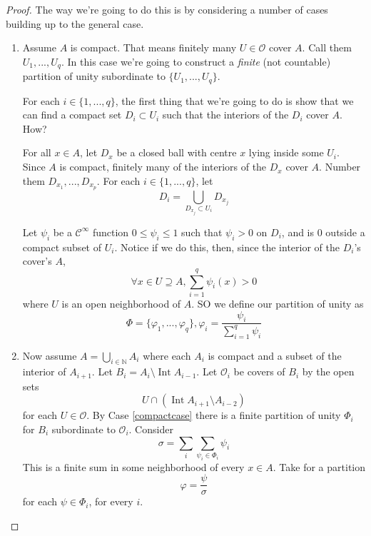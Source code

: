 \documentclass{article}
\DeclareMathOperator{\Int}{Int}
\newcommand{\nats}[0]{\mathbb{N}}
\newcommand{\mc}[1]{\mathcal{#1}}
\begin{document}
\begin{proof}

  The way we're going to do this is by considering a number of cases building up to the general case.

  \begin{enumerate}

    \item Assume \(A\) is compact. That means finitely many \(U \in \mc{O}\) cover \(A\). Call them \(U_1,...,U_q\). In this case we're going to construct a \textit{finite} (not countable) partition of unity subordinate to \(\{U_1,...,U_q\}\).

    For each \(i \in \{1,...,q\}\), the first thing that we're going to do is show that we can find a compact set \(D_i \subset U_i\) such that the interiors of the \(D_i\) cover \(A\). How?

    For all \(x \in A\), let \(D_x\) be a closed ball with centre \(x\) lying inside some \(U_i\). Since \(A\) is compact, finitely many of the interiors of the \(D_x\) cover \(A\). Number them \(D_{x_1},...,D_{x_p}\). For each \(i \in \{1,...,q\}\), let
    \begin{equation}
      D_i = \bigcup_{D_{x_j} \subset U_i}D_{x_j}
    \end{equation}

    Let \(\psi_i\) be a \(\mc{C}^\infty\) function \(0 \leq \psi_i \leq 1\) such that \(\psi_i > 0\) on \(D_i\), and is 0 outside a compact subset of \(U_i\). Notice if we do this, then, since the interior of the \(D_i\)'s cover's \(A\),
    \begin{equation}
      \forall x \in U \supseteq A, \sum_{i = 1}^q\psi_i(x) > 0
    \end{equation}
    where \(U\) is an open neighborhood of \(A\). SO we define our partition of unity as
    \begin{equation}
      \Phi = \{\varphi_1,...,\varphi_q\}, \varphi_i = \frac{\psi_i}{\sum_{i = 1}^q\psi_i}
    \end{equation}
    \label{compactcase}

    \item Now assume \(A = \bigcup_{i \in \nats}A_i\) where each \(A_i\) is compact and a subset of the interior of \(A_{i + 1}\). Let \(B_i = A_i \setminus \Int A_{i - 1}\). Let \(\mc{O}_i\) be covers of \(B_i\) by the open sets
    \begin{equation}
      U \cap (\Int A_{i + 1} \setminus A_{i - 2})
    \end{equation}
    for each \(U \in \mc{O}\). By Case \ref{compactcase} there is a finite partition of unity \(\Phi_i\) for \(B_i\) subordinate to \(\mc{O}_i\). Consider
    \begin{equation}
      \sigma = \sum_i\sum_{\psi_i \in \Phi_i}\psi_i
    \end{equation}
    This is a finite sum in some neighborhood of every \(x \in A\). Take for a partition
    \begin{equation}
      \varphi = \frac{\psi}{\sigma}
    \end{equation}
    for each \(\psi \in \Phi_i\), for every \(i\).


\end{enumerate}
\end{proof}
\end{document}
